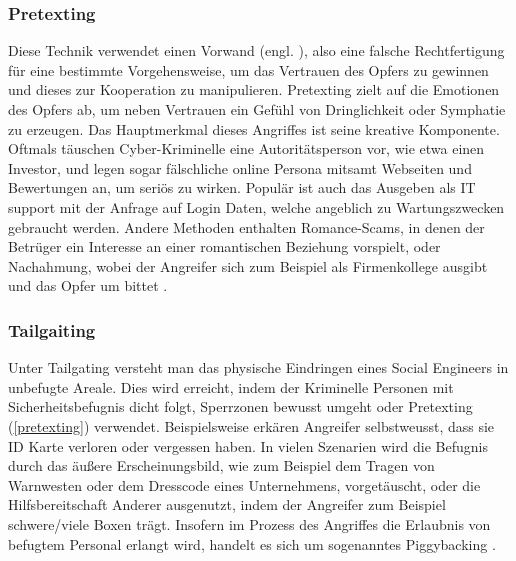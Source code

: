\subsubsection{Pretexting}
\label{pretexting}
Diese Technik verwendet einen Vorwand (engl. ), also eine falsche Rechtfertigung für eine bestimmte Vorgehensweise, um das Vertrauen des
Opfers zu gewinnen und dieses zur Kooperation zu manipulieren. Pretexting zielt auf die Emotionen des Opfers ab, um neben Vertrauen ein Gefühl von
Dringlichkeit oder Symphatie zu erzeugen. Das Hauptmerkmal dieses Angriffes ist seine kreative Komponente. Oftmals täuschen Cyber-Kriminelle
eine Autoritätsperson vor, wie etwa einen Investor, und legen sogar fälschliche online Persona mitsamt Webseiten und Bewertungen an, um seriös zu wirken.
Populär ist auch das Ausgeben als IT support mit der Anfrage auf Login Daten, welche angeblich zu Wartungszwecken gebraucht werden.
Andere Methoden enthalten Romance-Scams, in denen der Betrüger ein Interesse an einer romantischen Beziehung vorspielt, oder Nachahmung, wobei der
Angreifer sich zum Beispiel als Firmenkollege ausgibt und das Opfer um  bittet .

\subsubsection{Tailgaiting}
\label{tailgating}
Unter Tailgating versteht man das physische Eindringen eines Social Engineers in unbefugte Areale.
Dies wird erreicht, indem der Kriminelle Personen mit Sicherheitsbefugnis dicht folgt, Sperrzonen bewusst umgeht oder Pretexting (\autoref{pretexting})
verwendet. Beispielsweise erkären Angreifer selbstweusst, dass sie ID Karte verloren oder vergessen haben. In vielen Szenarien wird die
Befugnis durch das äußere Erscheinungsbild, wie zum Beispiel dem Tragen von Warnwesten oder dem Dresscode eines Unternehmens, vorgetäuscht, oder die Hilfsbereitschaft Anderer ausgenutzt,
indem der Angreifer zum Beispiel schwere/viele Boxen trägt. Insofern im Prozess des Angriffes die Erlaubnis von befugtem Personal erlangt wird, handelt es sich um sogenanntes Piggybacking .

